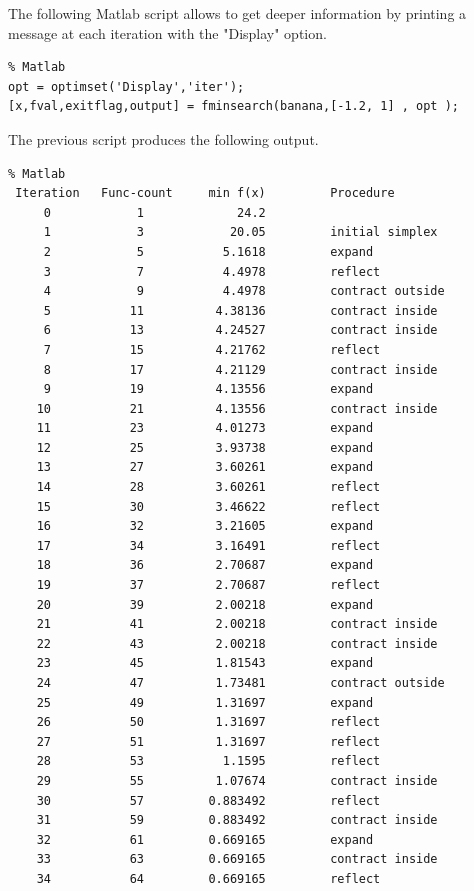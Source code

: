 The following Matlab script allows to get deeper information by printing a message at each iteration
with the "Display" option.

\lstset{language=matlabscript}
\begin{lstlisting}
% Matlab
opt = optimset('Display','iter');
[x,fval,exitflag,output] = fminsearch(banana,[-1.2, 1] , opt );
\end{lstlisting}

The previous script produces the following output.

\lstset{language=matlabscript}
\begin{lstlisting}
% Matlab
 Iteration   Func-count     min f(x)         Procedure
     0            1             24.2         
     1            3            20.05         initial simplex
     2            5           5.1618         expand
     3            7           4.4978         reflect
     4            9           4.4978         contract outside
     5           11          4.38136         contract inside
     6           13          4.24527         contract inside
     7           15          4.21762         reflect
     8           17          4.21129         contract inside
     9           19          4.13556         expand
    10           21          4.13556         contract inside
    11           23          4.01273         expand
    12           25          3.93738         expand
    13           27          3.60261         expand
    14           28          3.60261         reflect
    15           30          3.46622         reflect
    16           32          3.21605         expand
    17           34          3.16491         reflect
    18           36          2.70687         expand
    19           37          2.70687         reflect
    20           39          2.00218         expand
    21           41          2.00218         contract inside
    22           43          2.00218         contract inside
    23           45          1.81543         expand
    24           47          1.73481         contract outside
    25           49          1.31697         expand
    26           50          1.31697         reflect
    27           51          1.31697         reflect
    28           53           1.1595         reflect
    29           55          1.07674         contract inside
    30           57         0.883492         reflect
    31           59         0.883492         contract inside
    32           61         0.669165         expand
    33           63         0.669165         contract inside
    34           64         0.669165         reflect

\end{lstlisting}
